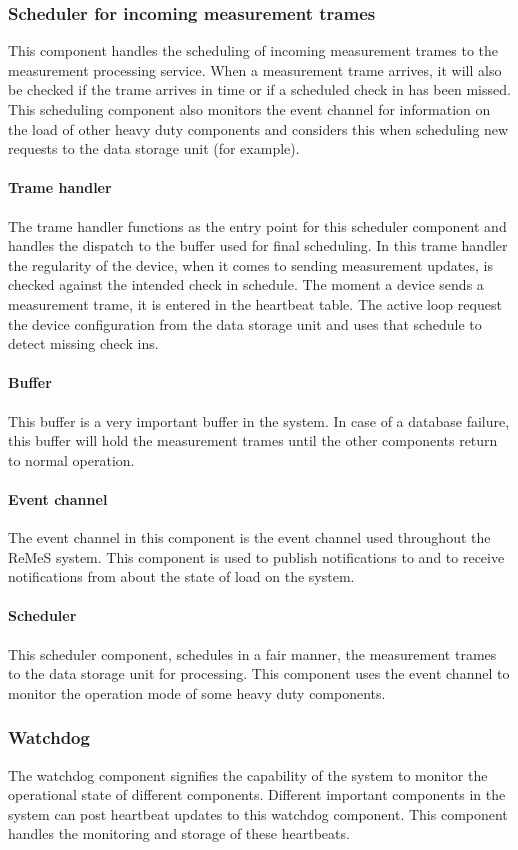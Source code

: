 \subsubsection{Scheduler for incoming measurement trames}
This component handles the scheduling of incoming measurement trames to the measurement processing service. 
When a measurement trame arrives, it will also be checked if the trame arrives in time or if a scheduled check in has been missed.
This scheduling component also monitors the event channel for information on the load of other heavy duty components and considers this when scheduling new requests to the data storage unit (for example).
\paragraph{Trame handler}
The trame handler functions as the entry point for this scheduler component and handles the dispatch to the buffer used for final scheduling. 
In this trame handler the regularity of the device, when it comes to sending measurement updates, is checked against the intended check in schedule. 
The moment a device sends a measurement trame, it is entered in the heartbeat table. The active loop request the device configuration from the data storage unit and uses that schedule to detect missing check ins.
\paragraph{Buffer}
This buffer is a very important buffer in the system. In case of a database failure, this buffer will hold the measurement trames until the other components return to normal operation.
\paragraph{Event channel}
The event channel in this component is the event channel used throughout the ReMeS system. This component is used to publish notifications to and to receive notifications from about the state of load on the system.
\paragraph{Scheduler}  
This scheduler component, schedules in a fair manner, the measurement trames to the data storage unit for processing. This component uses the event channel to monitor the operation mode of some heavy duty components. 
\subsubsection{Watchdog}
The watchdog component signifies the capability of the system to monitor the operational state of different components. Different important components in the system can post heartbeat updates to this watchdog component. This component handles the monitoring and storage of these heartbeats.
